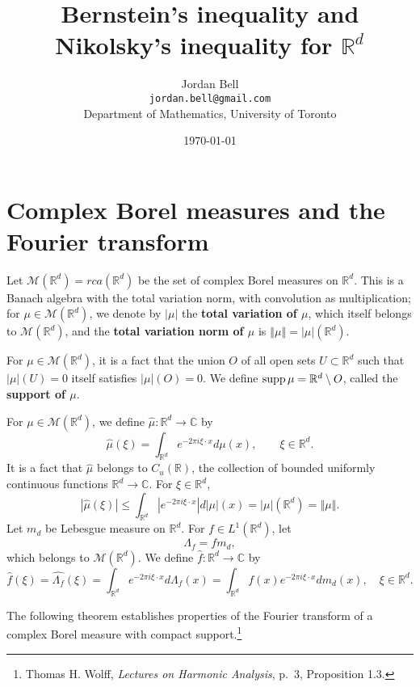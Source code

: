 \documentclass{article}
\newcommand{\supp}{\ensuremath\mathrm{supp}\,}
\newcommand{\norm}[1]{\left\Vert #1 \right\Vert}
\theoremstyle{definition}
\begin{document}
\title{Bernstein's inequality and Nikolsky's inequality for $\mathbb{R}^d$}
\author{Jordan Bell\\ \texttt{jordan.bell@gmail.com}\\Department of Mathematics, University of Toronto}
\date{\today}

\maketitle

\section{Complex Borel measures and the Fourier transform}
Let $\mathcal{M}(\mathbb{R}^d)=rca(\mathbb{R}^d)$ be the set of complex Borel measures on $\mathbb{R}^d$.  This is a Banach
algebra with the total variation norm, with convolution as multiplication; for $\mu \in \mathcal{M}(\mathbb{R}^d)$, we denote by $|\mu|$ the \textbf{total variation of $\mu$}, which
itself belongs to $\mathcal{M}(\mathbb{R}^d)$, and the \textbf{total variation norm of $\mu$} is $\norm{\mu}=|\mu|(\mathbb{R}^d)$.


For $\mu \in \mathcal{M}(\mathbb{R}^d)$, it is a fact that the union $O$ of all open sets $U \subset \mathbb{R}^d$ such that
$|\mu|(U)=0$ itself satisfies $|\mu|(O)=0$. We define $\supp \mu = \mathbb{R}^d \setminus O$, called the \textbf{support of $\mu$}.

For $\mu \in \mathcal{M}(\mathbb{R}^d)$, we define $\hat{\mu}:\mathbb{R}^d \to \mathbb{C}$ by
\[
\hat{\mu}(\xi) = \int_{\mathbb{R}^d} e^{-2\pi i\xi\cdot x} d\mu(x), \qquad
\xi \in \mathbb{R}^d.
\]
It is a fact that  $\hat{\mu}$ belongs to $C_u(\mathbb{R})$, the collection of bounded uniformly continuous functions $\mathbb{R}^d \to \mathbb{C}$.
For $\xi \in \mathbb{R}^d$,
\begin{equation}
|\hat{\mu}(\xi)| \leq \int_{\mathbb{R}^d} |e^{-2\pi i\xi\cdot x}| d|\mu|(x)
=|\mu|(\mathbb{R}^d) = \norm{\mu}.
\label{TVnorm}
\end{equation}
Let $m_d$ be Lebesgue measure on $\mathbb{R}^d$.
For $f \in L^1(\mathbb{R}^d)$, let
\[
\Lambda_f = f m_d,
\]
which belongs to $\mathcal{M}(\mathbb{R}^d)$. We define $\hat{f}:\mathbb{R}^d \to \mathbb{C}$ by
\[
\hat{f}(\xi)  = \widehat{\Lambda_f}(\xi) = \int_{\mathbb{R}^d} e^{-2\pi i\xi\cdot x} d\Lambda_f(x)=
\int_{\mathbb{R}^d} f(x) e^{-2\pi i\xi\cdot x} dm_d(x),
\quad \xi \in \mathbb{R}^d.
\]

The following theorem establishes properties of the Fourier transform of a complex Borel measure with compact support.\footnote{Thomas H. Wolff,
{\em Lectures on Harmonic Analysis}, p.~3, Proposition 1.3.}
\end{document}
